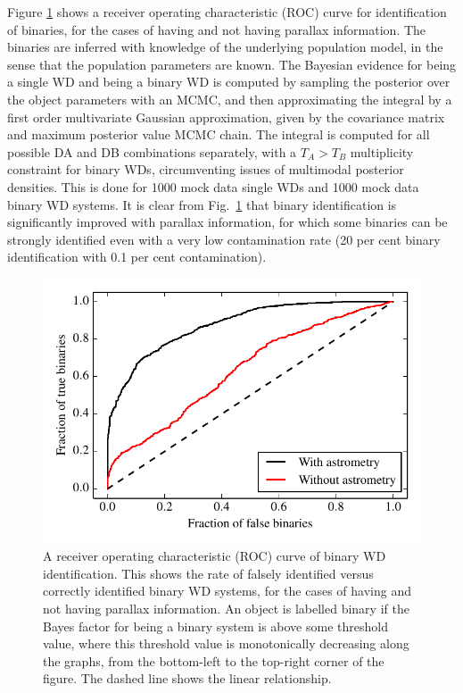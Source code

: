 \documentclass[fleqn,usenatbib]{mnras}
\newcommand{\Teff}{T}
\begin{document}
Figure \ref{fig:ROC_binaries} shows a receiver operating characteristic (ROC) curve for identification of binaries, for the cases of having and not having parallax information. The binaries are inferred with knowledge of the underlying population model, in the sense that the population parameters are known. The Bayesian evidence for being a single WD and being a binary WD is computed by sampling the posterior over the object parameters with an MCMC, and then approximating the integral by a first order multivariate Gaussian approximation, given by the covariance matrix and maximum posterior value MCMC chain. The integral is computed for all possible DA and DB combinations separately, with a $\Teff_A>\Teff_B$ multiplicity constraint for binary WDs, circumventing issues of multimodal posterior densities. This is done for 1000 mock data single WDs and 1000 mock data binary WD systems. It is clear from Fig.~\ref{fig:ROC_binaries} that binary identification is significantly improved with parallax information, for which some binaries can be strongly identified even with a very low contamination rate (20 per cent binary identification with 0.1 per cent contamination).
\begin{figure}
	\includegraphics[width=\columnwidth]{ROC_binaries.pdf}
    \caption{A receiver operating characteristic (ROC) curve of binary WD identification. This shows the rate of falsely identified versus correctly identified binary WD systems, for the cases of having and not having parallax information. An object is labelled binary if the Bayes factor for being a binary system is above some threshold value, where this threshold value is monotonically decreasing along the graphs, from the bottom-left to the top-right corner of the figure. The dashed line shows the linear relationship.}
    \label{fig:ROC_binaries}
\end{figure}
\end{document}

